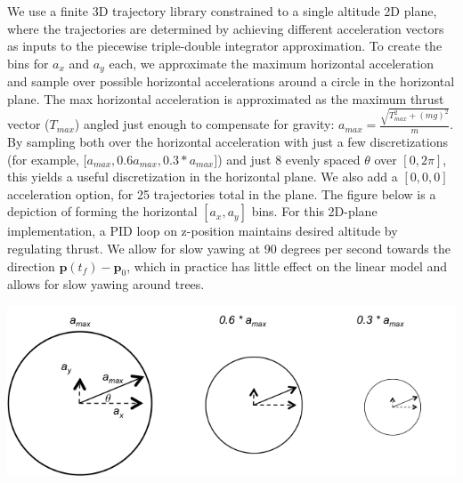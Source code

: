 \documentclass{llncs}
\begin{document}
We use a finite 3D trajectory library constrained to a single altitude 2D plane, where the trajectories are determined by achieving different acceleration vectors as inputs to the piecewise triple-double integrator approximation.  To create the bins for $a_x$ and $a_y$ each, we approximate the maximum horizontal acceleration and sample over possible horizontal accelerations around a circle in the horizontal plane.   The max horizontal acceleration is approximated as the maximum thrust vector ($T_{max}$) angled just enough to compensate for gravity: $a_{max} = \frac{ \sqrt{ T_{max}^2 + (mg)^2}}{m}$.  By sampling both over the horizontal acceleration with just a few discretizations (for example, [$a_{max}, 0.6a_{max}, 0.3*a_{max} ]$) and just 8 evenly spaced $\theta$ over $[0, 2\pi]$, this yields a useful discretization in the horizontal plane.  We also add a $[0,0,0]$ acceleration option, for 25 trajectories total in the plane.  The figure below is a depiction of forming the horizontal $[a_x, a_y]$ bins.  For this 2D-plane implementation, a PID loop on z-position maintains desired altitude by regulating thrust.  We allow for slow yawing at 90 degrees per second towards the direction $\mathbf{p}(t_f) - \mathbf{p}_0$, which in practice has little effect on the linear model and allows for slow yawing around trees.

\begin{center}
  \includegraphics[keepaspectratio=true,scale=0.6]{images/horizontal_actions.png}
  \label{visina82}%
\end{center}

%
\end{document}
